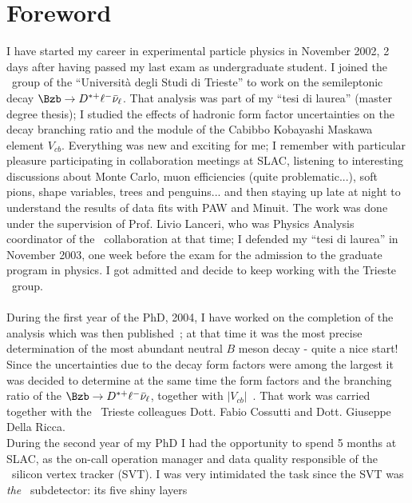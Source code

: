 \chapter*{Foreword}

I have started my career in experimental particle physics in November 2002, 2 days after having passed 
my last exam as  undergraduate student. I joined the \babar\ group of the ``Universit\`a degli Studi 
di Trieste'' to work on the semileptonic decay $\Bzb\to D^{*+}\ell^{-}\bar{\nu}_{\ell}$. That analysis 
was part of my ``tesi di laurea'' (master degree thesis); I studied the effects of hadronic form factor 
uncertainties on the decay branching ratio
 and the module of the Cabibbo Kobayashi Maskawa element $V_{cb}$. 
 Everything was new and exciting for me; I remember 
with particular pleasure participating in collaboration meetings at SLAC, listening to interesting 
discussions about Monte Carlo, muon efficiencies (quite problematic...), soft pions, shape variables, 
trees and penguins... and then staying up late at night to understand the results of data fits with PAW 
and Minuit.
\newline The work was done under the supervision of Prof. Livio Lanceri, who was Physics Analysis coordinator 
of the \babar\ collaboration at that time;   I defended my ``tesi di laurea'' in November 2003, 
one week before the exam for the admission to the graduate program in physics. I got admitted 
and decide to keep working with the Trieste \babar\ group.
\\ \\
During the first year of the PhD, 2004, I have worked on the completion of the analysis which was 
then published~\cite{PhysRevD.71.051502}; at that time it was the most precise determination of the most 
abundant neutral $B$ meson decay - quite a nice start! 
Since the uncertainties due to the decay form factors were among the largest  it was decided 
to determine at the same time the form factors and  the branching ratio of the 
$\Bzb\to D^{*+}\ell^{-}\bar{\nu}_{\ell}$, together with $|V_{cb}|$~\cite{PhysRevD.77.032002}. 
That work was carried together with the \babar\ Trieste colleagues Dott. Fabio Cossutti and Dott. 
Giuseppe Della Ricca.
\\During the second year of my PhD I had the opportunity to spend 5 months at SLAC, as 
the on-call operation manager and data quality responsible of the \babar\ silicon vertex tracker (SVT). 
I was very intimidated the task since the SVT was {\it the} \babar\ subdetector: its five shiny layers 
